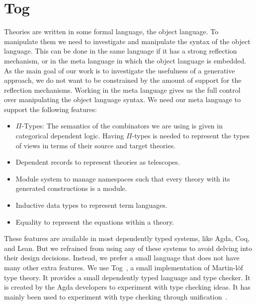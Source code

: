 \chapter{Tog}
\label{ch:tog}

Theories are written in some formal language, the object language. To manipulate them we need to investigate and manipulate the syntax of the object language. This can be done in the same language if it has a strong reflection mechanism, or in the meta language in which the object language is embedded. As the main goal of our work is to investigate the usefulness of a generative approach, we do not want to be constrained by the amount of support for the reflection mechanisms. Working in the meta language gives us the full control over manipulating the object language syntax. 
We need our meta language to support the following features: 
\begin{itemize}
\item $\Pi$-Types: The semantics of the combinators we are using is given in categorical dependent logic. Having $\Pi$-types is needed to represent the types of views in terms of their source and target theories. 
\item Dependent records to represent theories as telescopes. 
\item Module system to manage namespaces such that every theory with its generated constructions is a module. 
\item Inductive data types to represent term languages. 
\item Equality to represent the equations within a theory. 
\end{itemize}

These features are available in most dependently typed systems, like Agda, Coq, and Lean. But we refrained from using any of these systems to avoid delving into their design decisions. Instead, we prefer a small language that does not have many other extra features. We use Tog~\cite{tog}, a small implementation of Martin-l\"{o}f type theory. 
It provides a small dependently typed language and type checker. It is created by the Agda developers to experiment with type checking ideas. It has mainly been used to experiment with type checking through unification~\cite{mazzoli2016type}. 

